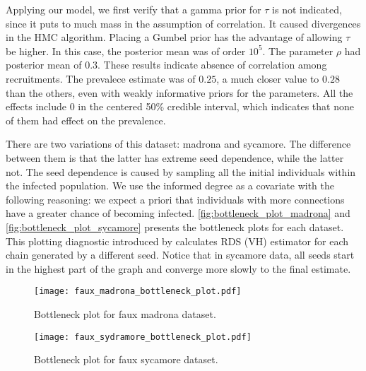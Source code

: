 Applying our model, we first verify that a gamma prior for $\tau$ is not
indicated, since it puts to much mass in the assumption of correlation. It
caused divergences in the HMC algorithm. Placing a Gumbel prior has the
advantage of allowing $\tau$ be higher. In this case, the posterior mean was
of order $10^{5}$. The parameter $\rho$ had posterior mean of $0.3$. These
results indicate absence of correlation among recruitments. The prevalece
estimate was of $0.25$, a much closer value to $0.28$ than the others, even
with weakly informative priors for the parameters. All the effects include 0
in the centered 50\% credible interval, which indicates that none of them
had effect on the prevalence.

There are two variations of this dataset: madrona and sycamore. The difference
between them is that the latter has extreme seed dependence, while the latter
not. The seed dependence is caused by sampling all the initial individuals
within the infected population. We use the informed degree as a covariate with
the following reasoning: we expect a priori that individuals with more
connections have a greater chance of becoming infected.
\autoref{fig:bottleneck_plot_madrona} and
\autoref{fig:bottleneck_plot_sycamore} presents the bottleneck plots for each
dataset. This plotting diagnostic introduced by \textcite{gile2015diagnostics}
calculates RDS (VH) estimator for each chain generated by a different seed.
Notice that in sycamore data, all seeds start in the highest part of the graph
and converge more slowly to the final estimate. 

\begin{figure}
    \centering
    \caption{\label{fig:bottleneck_plot_madrona}Bottleneck plot for faux
    madrona dataset.}
    \texttt{[image: faux\_madrona\_bottleneck\_plot.pdf]}
\end{figure}

\begin{figure}
    \centering
    \caption{\label{fig:bottleneck_plot_sycamore}Bottleneck plot for faux
    sycamore dataset.}
    \texttt{[image: faux\_sydramore\_bottleneck\_plot.pdf]}
\end{figure}

